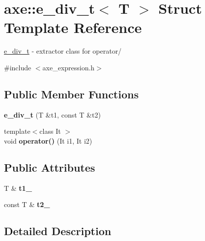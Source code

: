 \hypertarget{structaxe_1_1e__div__t}{\section{axe\+:\+:e\+\_\+div\+\_\+t$<$ T $>$ Struct Template Reference}
\label{structaxe_1_1e__div__t}
}


\hyperlink{structaxe_1_1e__div__t}{e\+\_\+div\+\_\+t} -\/ extractor class for operator/  




{\ttfamily \#include $<$axe\+\_\+expression.\+h$>$}

\subsection*{Public Member Functions}
\begin{DoxyCompactItemize}
\item 
\hypertarget{structaxe_1_1e__div__t_a18214c17cfbeb31354f3f00b5fde0ed7}{{\bfseries e\+\_\+div\+\_\+t} (T \&t1, const T \&t2)}\label{structaxe_1_1e__div__t_a18214c17cfbeb31354f3f00b5fde0ed7}

\item 
\hypertarget{structaxe_1_1e__div__t_a576009b3611b80b00fcee16b5594f19c}{{\footnotesize template$<$class It $>$ }\\void {\bfseries operator()} (It i1, It i2)}\label{structaxe_1_1e__div__t_a576009b3611b80b00fcee16b5594f19c}

\end{DoxyCompactItemize}
\subsection*{Public Attributes}
\begin{DoxyCompactItemize}
\item 
\hypertarget{structaxe_1_1e__div__t_aa7a06163acb147a26aebb573e3877ca0}{T \& {\bfseries t1\+\_\+}}\label{structaxe_1_1e__div__t_aa7a06163acb147a26aebb573e3877ca0}

\item 
\hypertarget{structaxe_1_1e__div__t_a70b477bc4d82edd1e9e3f2a2380d4ba3}{const T \& {\bfseries t2\+\_\+}}\label{structaxe_1_1e__div__t_a70b477bc4d82edd1e9e3f2a2380d4ba3}

\end{DoxyCompactItemize}


\subsection{Detailed Description}
